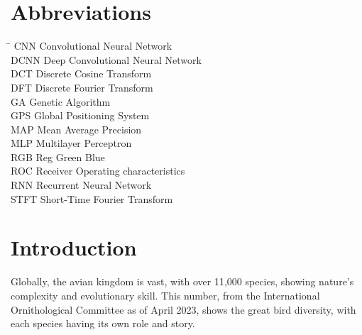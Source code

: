 \chapter*{Abbreviations}
\begin{tabbing}
    \hspace{50mm}\=\kill
    CNN \> Convolutional Neural Network\\
    DCNN \> Deep Convolutional Neural Network\\
    DCT \> Discrete Cosine Transform\\
    DFT \> Discrete Fourier Transform\\
    GA \> Genetic Algorithm\\
    GPS \> Global Positioning System\\
    MAP \> Mean Average Precision\\
    MLP \> Multilayer Perceptron\\ RGB \> Reg Green Blue\\ ROC \> Receiver
    Operating characteristics\\ RNN \> Recurrent Neural Network\\ STFT \>
    Short-Time Fourier Transform\\
\end{tabbing}
\newpage
{}

\chapter{Introduction}\label{sec}
Globally, the avian kingdom is vast, with over 11,000 species, showing nature's
complexity and evolutionary skill. This number, from the International
Ornithological Committee as of April 2023, shows the great bird diversity, with
each species having its own role and story.\cite{ioc_updates}

